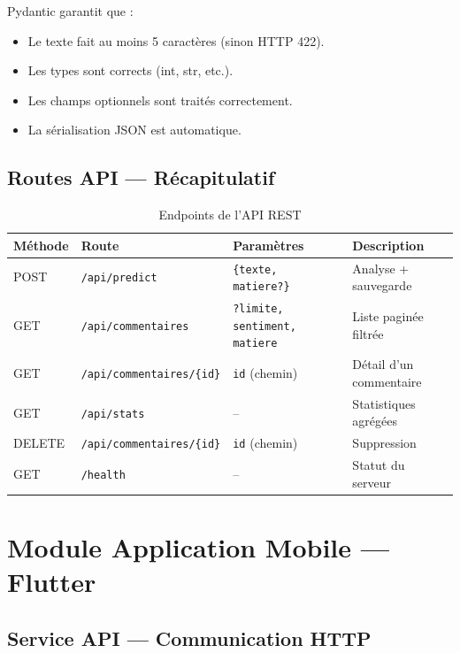 Pydantic garantit que :
\begin{itemize}
  \item Le texte fait au moins 5 caractères (sinon HTTP 422).
  \item Les types sont corrects (int, str, etc.).
  \item Les champs optionnels sont traités correctement.
  \item La sérialisation JSON est automatique.
\end{itemize}

\subsection{Routes API — Récapitulatif}

\begin{table}[H]
\centering
\caption{Endpoints de l'API REST}
\label{tab:endpoints}
\renewcommand{\arraystretch}{1.5}
\begin{tabular}{llp{3.5cm}p{3.5cm}}
\toprule
\rowcolor{bleuprincipal!15}
\textbf{Méthode} & \textbf{Route} & \textbf{Paramètres} & \textbf{Description} \\
\midrule
\rowcolor{vertprincipal!10}
POST & \texttt{/api/predict} & \texttt{\{texte, matiere?\}} & Analyse + sauvegarde \\
GET & \texttt{/api/commentaires} & \texttt{?limite, sentiment, matiere} & Liste paginée filtrée \\
\rowcolor{gray!8}
GET & \texttt{/api/commentaires/\{id\}} & \texttt{id} (chemin) & Détail d'un commentaire \\
GET & \texttt{/api/stats} & -- & Statistiques agrégées \\
\rowcolor{rougeprincipal!10}
DELETE & \texttt{/api/commentaires/\{id\}} & \texttt{id} (chemin) & Suppression \\
GET & \texttt{/health} & -- & Statut du serveur \\
\bottomrule
\end{tabular}
\end{table}

\section{Module Application Mobile — Flutter}

\subsection{Service API — Communication HTTP}

